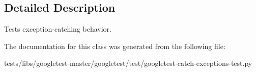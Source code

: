 \subsection{Detailed Description}
\begin{DoxyVerb}Tests exception-catching behavior.\end{DoxyVerb}
 

The documentation for this class was generated from the following file\+:\begin{DoxyCompactItemize}
\item 
tests/libs/googletest-\/master/googletest/test/googletest-\/catch-\/exceptions-\/test.\+py\end{DoxyCompactItemize}
